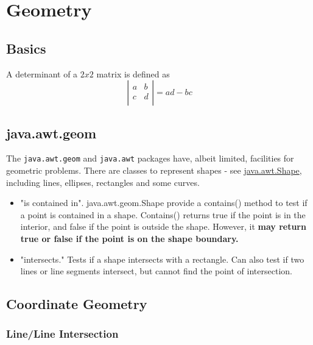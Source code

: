 \chapter{Geometry}

\section{Basics}

A determinant of a $2x2$ matrix is defined as
\[
    \left\vert
        \begin{array}{cc}
            a & b \\
            c & d \\
        \end{array}
    \right\vert
    = a d - b c
\]

\section{java.awt.geom}

The \texttt{java.awt.geom} and \texttt{java.awt} packages have, albeit limited, facilities
for geometric problems.  There are classes to represent shapes - see 
\href{http://docs.oracle.com/javase/6/docs/api/java/awt/Shape.html}{java.awt.Shape}, including
lines, ellipses, rectangles and some curves.

\begin{itemize}
\item "is contained in".  java.awt.geom.Shape provide a contains() method to test if a point
    is contained in a shape.  Contains() returns true if the point is in the interior, and false
    if the point is outside the shape. However, it \textbf{may return true or false if the point is 
    on the shape boundary.}

\item "intersects."  Tests if a shape intersects with a rectangle.
    Can also test if two lines or line segments intersect, but cannot find the point of
    intersection.

\end{itemize}

\section{Coordinate Geometry}

\subsection{Line/Line Intersection}
\label{sec:lineintersection}

